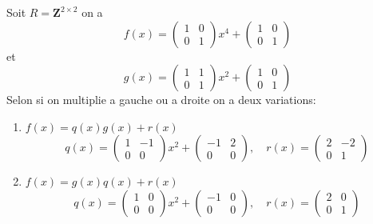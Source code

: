 \begin{example}
Soit $R=\mathbf{Z}^{2\times2}$ on a 
$$
f(x)=\begin{pmatrix}
1 & 0 \\
0 & 1 
\end{pmatrix}x^{4}+\begin{pmatrix}
1 & 0 \\
0 & 1
\end{pmatrix}
$$
et
$$
g(x)=\begin{pmatrix}
1 & 1 \\
0 & 1
\end{pmatrix}x^{2}+\begin{pmatrix}
1 & 0 \\
0 & 1
\end{pmatrix}
$$
Selon si on multiplie a gauche ou a droite on a deux variations:
\begin{enumerate}
\item $f(x)=q(x)g(x)+r(x)$
$$
q(x)=\begin{pmatrix}
1 & -1 \\
0 & 0 
\end{pmatrix}x^{2}+\begin{pmatrix}
-1 & 2 \\
0 & 0
\end{pmatrix},\quad r(x)=\begin{pmatrix}
2 & -2 \\
0 & 1
\end{pmatrix}
$$
\item $f(x)=g(x)q(x)+r(x)$
$$
q(x)=\begin{pmatrix}
1 & 0 \\
0 & 0
\end{pmatrix}x^{2}+\begin{pmatrix}
-1 & 0 \\
0 & 0
\end{pmatrix},\quad r(x)=\begin{pmatrix}
2 & 0 \\
0 & 1
\end{pmatrix}
$$
\end{enumerate}
\end{example}
